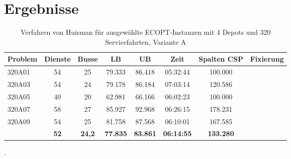 \chapter{Ergebnisse}

\begin{table}[h]
\begin{tabular}{lccccccc}

{\bf Problem} & {\bf Dienste} & {\bf Busse} &   {\bf LB} &   {\bf UB} & {\bf Zeit} & {\bf Spalten CSP} & {\bf Fixierung} \\
\hline
    320A01 &         54 &         25 &     79.333 &     86.418 &   05:32:44 &    100.000 &            \\

    320A03 &         54 &         24 &     79.178 &     86.184 &   07:03:14 &    120.586 &            \\

    320A05 &         40 &         20 &     62.981 &     66.166 &   06:02:23 &    100.000 &            \\

    320A07 &         58 &         27 &     85.927 &     92.968 &   06:26:15 &    178.231 &            \\

    320A09 &         54 &         25 &     81.758 &     87.568 &   06:10:01 &    167.585 &            \\
\hline
           &   {\bf 52} & {\bf 24,2} & {\bf 77.835} & {\bf 83.861} & {\bf 06:14:55} & {\bf 133.280} &     {\bf } \\

\end{tabular}
\caption{Verfahren von Huisman für ausgewählte ECOPT-Instanzen mit 4 Depots und 320 Servicefahrten, Variante A}.
\end{table}

